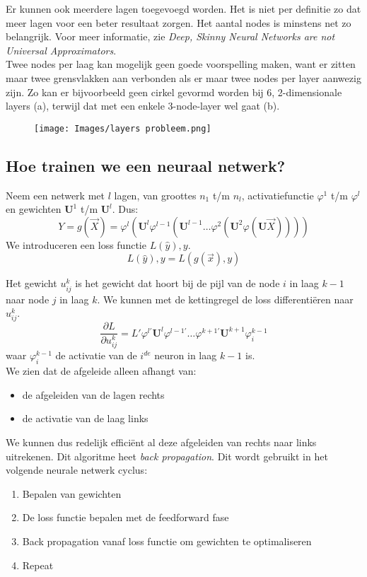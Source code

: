 {\noindent Er kunnen ook meerdere lagen toegevoegd worden. Het is niet per definitie zo dat meer lagen voor een beter resultaat zorgen. Het aantal nodes is minstens net zo belangrijk. Voor meer informatie, zie \textit{Deep, Skinny Neural Networks are not Universal Approximators}.\\

\noindent
Twee nodes per laag kan mogelijk geen goede voorspelling maken, want er zitten maar twee grensvlakken aan verbonden als er maar twee nodes per layer aanwezig zijn. Zo kan er bijvoorbeeld geen cirkel gevormd worden bij 6, 2-dimensionale layers (a), terwijl dat met een enkele 3-node-layer wel gaat (b).
\begin{figure}[h]
    \centering
    \texttt{[image: Images/layers probleem.png]}
    \caption*{}
    \label{fig:layer}
\end{figure}\vspace{-1cm}

\subsection{Hoe trainen we een neuraal netwerk?}
Neem een netwerk met $l$ lagen, van groottes $n_1$ t/m $n_l$, activatiefunctie $\varphi^1$ t/m $\varphi^l$ en gewichten $\textbf{U}^1$ t/m $\textbf{U}^l$. Dus:
\[Y=g(\overrightarrow{X})=\varphi^l(\textbf{U}^l\varphi^{l-1}(\textbf{U}^{l-1}\dots\varphi^2(\textbf{U}^2\varphi(\textbf{U}\overrightarrow{X}))))\]
We introduceren een loss functie $L(\hat{y}),y$. 
\[L(\hat{y}),y=L(g(\overrightarrow{x}),y)\]

\noindent Het gewicht $u_{ij}^k$ is het gewicht dat hoort bij de pijl van de node $i$ in laag $k-1$ naar node $j$ in laag $k$. We kunnen met de kettingregel de loss differentiëren naar $u_{ij}^k$.
\[\frac{\partial L}{\partial u_{ij}^k}=L'\varphi^{l'}\textbf{U}^l\varphi^{l-1'}\dots \varphi^{k+1'}\textbf{U}^{k+1}\varphi_i^{k-1}\]
waar $\varphi_i^{k-1}$ de activatie van de $i^{de}$ neuron in laag $k-1$ is.\\

\noindent We zien dat de afgeleide alleen afhangt van:
\begin{itemize}
    \item de afgeleiden van de lagen rechts
    \item de activatie van de laag links
\end{itemize}
We kunnen dus redelijk efficiënt al deze afgeleiden van rechts naar links uitrekenen. Dit algoritme heet \textit{back propagation}. Dit wordt gebruikt in het volgende neurale netwerk cyclus:
\begin{enumerate}
    \item Bepalen van gewichten
    \item De loss functie bepalen met de feedforward fase
    \item Back propagation vanaf loss functie om gewichten te optimaliseren
    \item Repeat
\end{enumerate}

}
